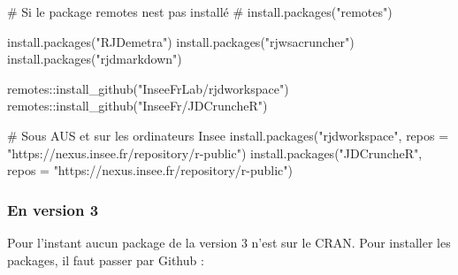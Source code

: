 \documentclass[
]{article}
\newenvironment{Shaded}{\begin{snugshade}}{\end{snugshade}}
\newcommand{\AttributeTok}[1]{\textcolor[rgb]{0.40,0.45,0.13}{#1}}
\newcommand{\CommentTok}[1]{\textcolor[rgb]{0.37,0.37,0.37}{#1}}
\newcommand{\FunctionTok}[1]{\textcolor[rgb]{0.28,0.35,0.67}{#1}}
\newcommand{\NormalTok}[1]{\textcolor[rgb]{0.00,0.46,0.62}{#1}}
\newcommand{\SpecialCharTok}[1]{\textcolor[rgb]{0.37,0.37,0.37}{#1}}
\newcommand{\StringTok}[1]{\textcolor[rgb]{0.13,0.47,0.30}{#1}}
\begin{document}
\begin{Shaded}
\begin{Highlighting}[]
\CommentTok{\# Si le package remotes n\textquotesingle{}est pas installé}
\CommentTok{\# install.packages("remotes")}

\FunctionTok{install.packages}\NormalTok{(}\StringTok{"RJDemetra"}\NormalTok{)}
\FunctionTok{install.packages}\NormalTok{(}\StringTok{"rjwsacruncher"}\NormalTok{)}
\FunctionTok{install.packages}\NormalTok{(}\StringTok{"rjdmarkdown"}\NormalTok{)}

\NormalTok{remotes}\SpecialCharTok{::}\FunctionTok{install\_github}\NormalTok{(}\StringTok{"InseeFrLab/rjdworkspace"}\NormalTok{)}
\NormalTok{remotes}\SpecialCharTok{::}\FunctionTok{install\_github}\NormalTok{(}\StringTok{"InseeFr/JDCruncheR"}\NormalTok{)}

\CommentTok{\# Sous AUS et sur les ordinateurs Insee}
\FunctionTok{install.packages}\NormalTok{(}\StringTok{"rjdworkspace"}\NormalTok{, }\AttributeTok{repos =} \StringTok{"https://nexus.insee.fr/repository/r{-}public"}\NormalTok{)}
\FunctionTok{install.packages}\NormalTok{(}\StringTok{"JDCruncheR"}\NormalTok{, }\AttributeTok{repos =} \StringTok{"https://nexus.insee.fr/repository/r{-}public"}\NormalTok{)}
\end{Highlighting}
\end{Shaded}

\hypertarget{en-version-3}{%
\subsubsection{En version 3}\label{en-version-3}}

Pour l'instant aucun package de la version 3 n'est sur le CRAN. Pour
installer les packages, il faut passer par Github :
\end{document}
